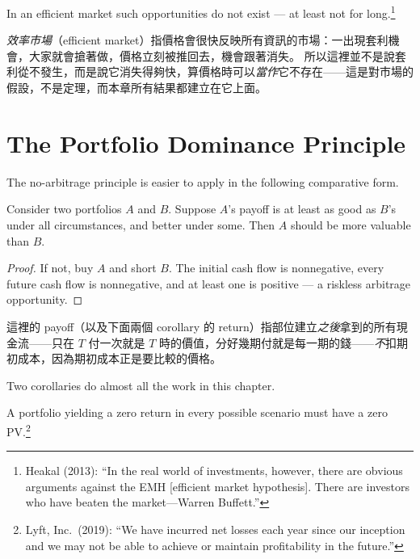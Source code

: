In an efficient market such opportunities do not exist --- at least not for long.\footnote{Heakal (2013): ``In the real world of investments, however, there are obvious arguments against the EMH [efficient market hypothesis]. There are investors who have beaten the market---Warren Buffett.''}

\suppstart
\begin{remark}
	\emph{效率市場}（efficient market）指價格會很快反映所有資訊的市場：一出現套利機會，大家就會搶著做，價格立刻被推回去，機會跟著消失。
	所以這裡並不是說套利從不發生，而是說它消失得夠快，算價格時可以\emph{當作}它不存在——這是對市場的假設，不是定理，而本章所有結果都建立在它上面。
\end{remark}
\suppend

\section{The Portfolio Dominance Principle}
\label{sec:dominance}


The no-arbitrage principle is easier to apply in the following comparative form.

\begin{proposition}
	\label{prop:dominance}
	Consider two portfolios $A$ and $B$.
	Suppose $A$'s payoff is at least as good as $B$'s under all circumstances, and better under some.
	Then $A$ should be more valuable than $B$.
\end{proposition}

\suppstart
\begin{proof}
	If not, buy $A$ and short $B$.
	The initial cash flow is nonnegative, every future cash flow is nonnegative, and at least one is positive --- a riskless arbitrage opportunity.
\end{proof}

\begin{remark}
	這裡的 payoff（以及下面兩個 corollary 的 return）指部位建立\emph{之後}拿到的所有現金流——只在 $T$ 付一次就是 $T$ 時的價值，分好幾期付就是每一期的錢——\emph{不}扣期初成本，因為期初成本正是要比較的價格。
\end{remark}
\suppend

Two corollaries do almost all the work in this chapter.

\begin{corollary}
	\label{cor:zero-pv}
	A portfolio yielding a zero return in every possible scenario must have a zero PV.\footnote{Lyft, Inc.\ (2019): ``We have incurred net losses each year since our inception and we may not be able to achieve or maintain profitability in the future.''}
\end{corollary}

